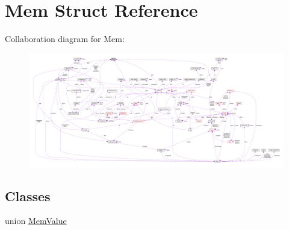 \hypertarget{structMem}{}\section{Mem Struct Reference}
\label{structMem}


Collaboration diagram for Mem\+:\nopagebreak
\begin{figure}[H]
\begin{center}
\leavevmode
\includegraphics[width=350pt]{structMem__coll__graph}
\end{center}
\end{figure}
\subsection*{Classes}
\begin{DoxyCompactItemize}
\item 
union \hyperlink{unionMem_1_1MemValue}{Mem\+Value}
\end{DoxyCompactItemize}
